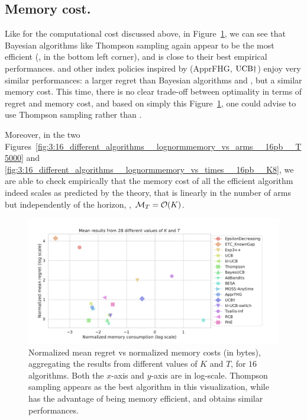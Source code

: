 \subsection{Memory cost.}

Like for the computational cost discussed above,
in Figure~\ref{fig:3:16_different_algorithms__lognormregret_vs_logmemory__28pb}, we can see that Bayesian algorithms like Thompson sampling again appear to be the most efficient (\ie, in the bottom left corner), and \klUCB{} is close to their best empirical performances.
\UCB{} and other index policies inspired by \UCB{} (ApprFHG, $\mathrm{UCB}\dagger$) enjoy very similar performances: a larger regret than Bayesian algorithms and \klUCB, but a similar memory cost.
%
This time, there is no clear trade-off between optimality in terms of regret and memory cost, and based on simply this Figure~\ref{fig:3:16_different_algorithms__lognormregret_vs_logmemory__28pb}, one could advise to use Thompson sampling rather than \klUCB.

Moreover, in the two Figures~\ref{fig:3:16_different_algorithms__lognormmemory_vs_arms__16pb__T5000} and
\ref{fig:3:16_different_algorithms__lognormmemory_vs_times__16pb__K8},
we are able to check empirically that the memory cost of all the efficient algorithm indeed scales as predicted by the theory, that is
linearly in the number of arms but independently of the horizon, \ie, $\mathcal{M}_T = \mathop{}\mathopen{}\mathcal{O}\mathopen{}\left(K\right)$.

\begin{figure}[h!]  %
	\includegraphics[width=1.10\linewidth]{16_different_algorithms__lognormregret_vs_logmemory__28pb.pdf}
	\caption[Normalized mean regret vs normalized memory costs (in bytes).]{
        Normalized mean regret vs normalized memory costs (in bytes),
        aggregating the results from different values of $K$ and $T$, for $16$ algorithms.
        Both the $x$-axis and $y$-axis are in log-scale.
        Thompson sampling appears as the best algorithm in this visualization, while \UCB{} has the advantage of being memory efficient, and \klUCB{} obtains similar performances.
	}
	\label{fig:3:16_different_algorithms__lognormregret_vs_logmemory__28pb}
\end{figure}


